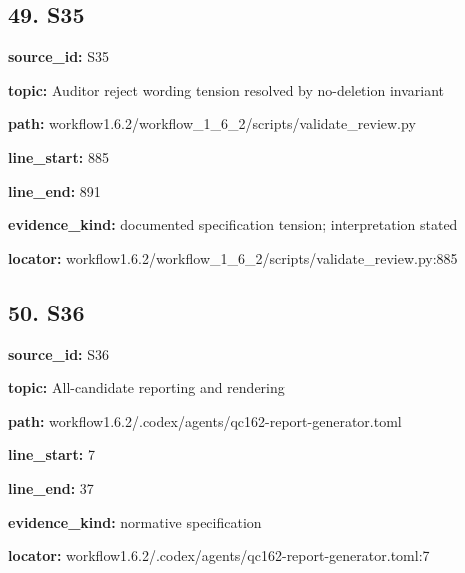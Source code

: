 \documentclass[10pt,a4paper]{article}
\begin{document}
\subsection*{49.\allowbreak{} S35}
\textbf{source\_\allowbreak{}id:} S35\par
\textbf{topic:} Auditor reject wording tension resolved by no-\allowbreak{}deletion invariant\par
\textbf{path:} workflow1.\allowbreak{}6.\allowbreak{}2/\allowbreak{}workflow\_\allowbreak{}1\_\allowbreak{}6\_\allowbreak{}2/\allowbreak{}scripts/\allowbreak{}validate\_\allowbreak{}review.\allowbreak{}py\par
\textbf{line\_\allowbreak{}start:} 885\par
\textbf{line\_\allowbreak{}end:} 891\par
\textbf{evidence\_\allowbreak{}kind:} documented specification tension; interpretation stated\par
\textbf{locator:} workflow1.\allowbreak{}6.\allowbreak{}2/\allowbreak{}workflow\_\allowbreak{}1\_\allowbreak{}6\_\allowbreak{}2/\allowbreak{}scripts/\allowbreak{}validate\_\allowbreak{}review.\allowbreak{}py:885\par
\subsection*{50.\allowbreak{} S36}
\textbf{source\_\allowbreak{}id:} S36\par
\textbf{topic:} All-\allowbreak{}candidate reporting and rendering\par
\textbf{path:} workflow1.\allowbreak{}6.\allowbreak{}2/\allowbreak{}.\allowbreak{}codex/\allowbreak{}agents/\allowbreak{}qc162-\allowbreak{}report-\allowbreak{}generator.\allowbreak{}toml\par
\textbf{line\_\allowbreak{}start:} 7\par
\textbf{line\_\allowbreak{}end:} 37\par
\textbf{evidence\_\allowbreak{}kind:} normative specification\par
\textbf{locator:} workflow1.\allowbreak{}6.\allowbreak{}2/\allowbreak{}.\allowbreak{}codex/\allowbreak{}agents/\allowbreak{}qc162-\allowbreak{}report-\allowbreak{}generator.\allowbreak{}toml:7\par
\end{document}
